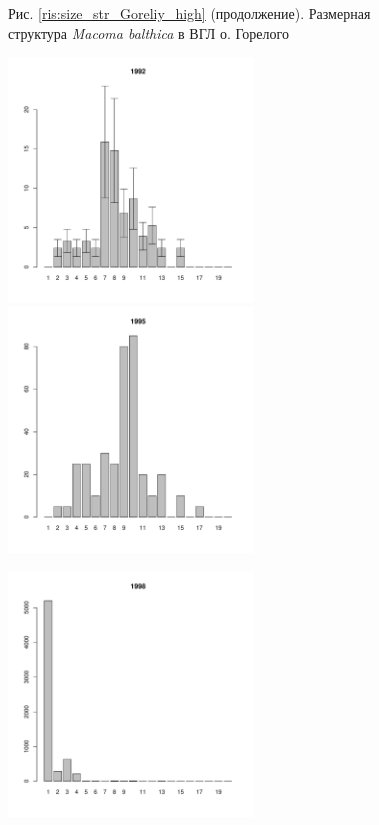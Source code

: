 \documentclass[12pt, a4paper]{article}
\begin{document}
\begin{figure}[h]


\begin{center}
Рис. \ref{ris:size_str_Goreliy_high} (продолжение). Размерная структура {\it Macoma balthica} в ВГЛ о. Горелого

\end{center}
\end{figure}



\begin{figure}[h]

\begin{multicols}{3}
\hfill
\includegraphics[width=65mm]{../White_Sea/Luvenga_Goreliy/middle_1992_.pdf}
\hfill
\includegraphics[width=65mm]{../White_Sea/Luvenga_Goreliy/middle_1995_.pdf}

\hfill
\includegraphics[width=65mm]{../White_Sea/Luvenga_Goreliy/middle_1998_.pdf}


\end{multicols}
\end{figure}
\end{document}

